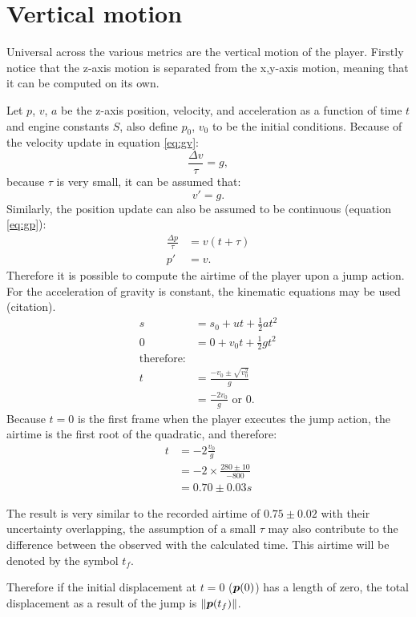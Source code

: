 \section{Vertical motion}
Universal across the various metrics are the vertical motion of the player. Firstly notice that the z-axis motion is separated from the x,y-axis motion, meaning that it can be computed on its own.

Let $p$, $v$, $a$ be the z-axis position, velocity, and acceleration as a function of time $t$ and engine constants $S$, also define $p_0$, $v_0$ to be the initial conditions. Because of the velocity update in equation \ref{eq:gv}:
\[
\frac{\Delta v}{\tau} = g,
\]
because $\tau$ is very small, it can be assumed that:
\[
v' = g.
\]
Similarly, the position update can also be assumed to be continuous (equation \ref{eq:gp}):
\begin{align*}
    \frac{\Delta p}{\tau} &= v(t+\tau)\\
    p' &= v.
\end{align*}
Therefore it is possible to compute the airtime of the player upon a jump action. For the acceleration of gravity is constant, the kinematic equations may be used (citation).
\begin{align*}
    s &= s_0 + ut + \frac{1}{2} a t^2\\
    0 &= 0 + v_0 t + \frac{1}{2} g t^2\\
    \text{therefore:}&\\
    t &= \frac{-v_0 \pm \sqrt{v_0^2}}{g}\\
    &= \frac{-2v_0}{g} \,\, \text{or} \,\, 0.
\end{align*}
Because $t=0$ is the first frame when the player executes the jump action, the airtime is the first root of the quadratic, and therefore:
\begin{align*}
    t &= -2 \frac{v_0}{g}\\
    &= -2 \times \frac{280\pm 10}{-800}\\
    &= 0.70 \pm 0.03 \si{s}
\end{align*}

The result is very similar to the recorded airtime of $0.75\pm 0.02$ with their uncertainty overlapping, the assumption of a small $\tau$ may also contribute to the difference between the observed with the calculated time. This airtime will be denoted by the symbol $t_f$.

Therefore if the initial displacement at $t=0$ ($\boldsymbol{p}(0)$) has a length of zero, the total displacement as a result of the jump is $\|\boldsymbol{p}(t_f)\|$.
